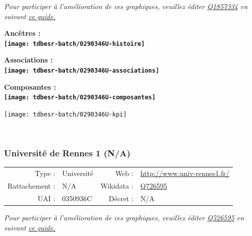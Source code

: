 \documentclass[12pt,french,]{article}
\begin{document}
\textit{\scriptsize Pour participer à l'amélioration de ces graphiques, veuillez éditer  \href{https://www.wikidata.org/entity/Q1857334}{Q1857334}  en suivant \href{https://github.com/cpesr/wikidataESR/blob/master/Rmd/wikidataESR.md}{ce guide.}}

\vspace{1cm}  
\begin{minipage}[b]{0.50\textwidth}\begin{center} \bf Ancêtres : \\  
\texttt{[image: tdbesr-batch/0290346U-histoire]} \end{center}\end{minipage}\begin{minipage}[b]{0.50\textwidth}\begin{center} \bf Associations : \\  
\texttt{[image: tdbesr-batch/0290346U-associations]} \end{center}\end{minipage}

\hrulefill

\begin{center} \bf Composantes : \\  
\texttt{[image: tdbesr-batch/0290346U-composantes]} \end{center}

\begin{center}\texttt{[image: tdbesr-batch/0290346U-kpi]} \end{center}\checkoddpage

\ifoddpage \fi ~\newpage  

\hypertarget{universituxe9-de-rennes-1-na}{%
\subsubsection{Université de Rennes 1
(N/A)}\label{universituxe9-de-rennes-1-na}}

\begin{tabular*}{\textwidth}{rp{5cm}rl}  
\hline  
Type : & Université & Web : &\href{http://www.univ-rennes1.fr/}{http://www.univ-rennes1.fr/} \\  
Rattachement : & N/A & Wikidata : & \href{https://www.wikidata.org/entity/Q726595}{Q726595} \\  
UAI : & 0350936C & Décret : & N/A \\  
\hline  
\end{tabular*}

\textit{\scriptsize Pour participer à l'amélioration de ces graphiques, veuillez éditer  \href{https://www.wikidata.org/entity/Q726595}{Q726595}  en suivant \href{https://github.com/cpesr/wikidataESR/blob/master/Rmd/wikidataESR.md}{ce guide.}}
\end{document}
